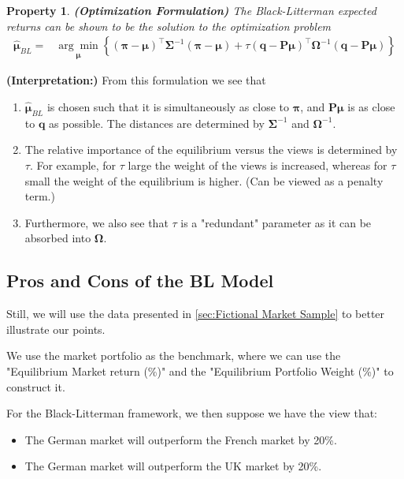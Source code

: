 \documentclass[13pt]{article}
\newtheorem{property}[theorem]{Property}
\theoremstyle{definition}
\theoremstyle{remark}
\newenvironment{remark}
  {\pushQED{\qed}\renewcommand{\qedsymbol}{$\triangle$}\remarkx}
  {\popQED\endremarkx}
\begin{document}
\begin{property}\textbf{(Optimization Formulation)}
The Black-Litterman expected returns can be shown to be the solution to the optimization problem
$$
\begin{aligned}
\bm{\hat{{\bm{\mu}}}}_{BL}= & \underset{{\bm{\mu}}}{\arg \min }\left\{({\bm{\pi}}-{\bm{\mu}})^{\top} {\mathbf{\Sigma}}^{-1}({\bm{\pi}}-{\bm{\mu}})+\tau(\bm{q}-\mathbf{P} {\bm{\mu}})^{\top} {\mathbf{\Omega}}^{-1}(\bm{q}-\mathbf{P} {\bm{\mu}})\right\}
\end{aligned}
$$
  
\end{property}

\begin{remark}\textbf{(Interpretation:)} From this formulation we see that\hfill
\begin{enumerate}
    \item  $\bm{\hat{{\bm{\mu}}}}_{BL}$ is chosen such that it is {\color{C6}simultaneously} as close to $\bm{\pi}$, and $\mathbf{P} \bm{\mu}$ is as close to $\bm{q}$ as possible. The distances are determined by ${\mathbf{\Sigma}}^{-1}$ and ${\mathbf{\Omega}}^{-1}$.
    \item The relative importance of the equilibrium versus the views is determined by $\tau$. For example, for $\tau$ large the weight of the views is increased, whereas for $\tau$ small the weight of the equilibrium is higher. (Can be viewed as a penalty term.)
    \item Furthermore,  we also see that $\tau$ is a "redundant" parameter as it can be absorbed into ${\mathbf{\Omega}}$.
\end{enumerate}
\end{remark}



\subsection{Pros and Cons of the BL Model}
Still, we will use the data presented in \cref{sec:Fictional Market Sample} to better illustrate our points.

We use the market portfolio as the benchmark, where we can use the "Equilibrium Market return (\%)" and the "Equilibrium Portfolio Weight (\%)" to construct it.

For the Black-Litterman framework, we then suppose we have the view that:

\begin{itemize}
\item The German market will outperform the French market by 20\%.
\item The German market will outperform the UK market by 20\%.
\end{itemize}
\end{document}

